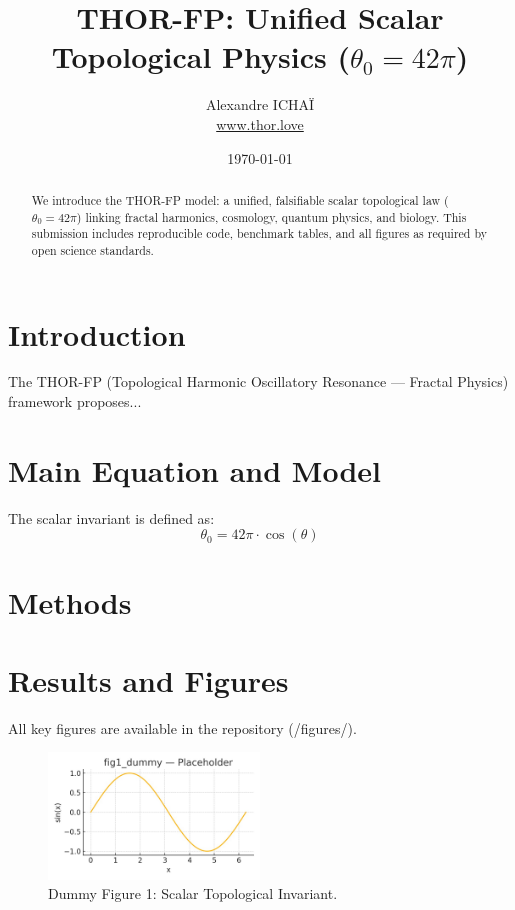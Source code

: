 \documentclass[11pt]{article}
\title{THOR-FP: Unified Scalar Topological Physics (\(\theta_0 = 42\pi\))}
\author{Alexandre ICHAÏ \\ \href{https://www.thor.love}{www.thor.love}}
\date{\today}
\begin{document}
\maketitle

\begin{abstract}
We introduce the THOR-FP model: a unified, falsifiable scalar topological law (\(\theta_0 = 42\pi\)) linking fractal harmonics, cosmology, quantum physics, and biology. This submission includes reproducible code, benchmark tables, and all figures as required by open science standards.
\end{abstract}

\section{Introduction}

The THOR-FP (Topological Harmonic Oscillatory Resonance — Fractal Physics) framework proposes...

\section{Main Equation and Model}

The scalar invariant is defined as:
\[
\theta_0 = 42\pi \cdot \cos(\theta)
\]


\section{Methods}


\section{Results and Figures}

All key figures are available in the repository (/figures/).

\begin{figure}[ht]
    \centering
    \includegraphics[width=0.5\textwidth]{figures/fig1_dummy.png}
    \caption{Dummy Figure 1: Scalar Topological Invariant.}
\end{figure}
\end{document}
